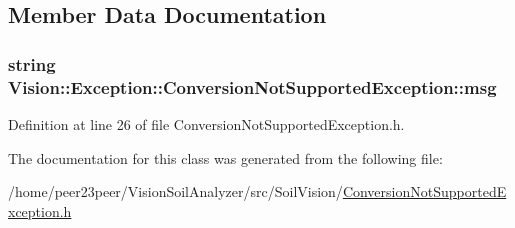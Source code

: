 \subsection{Member Data Documentation}
\hypertarget{class_vision_1_1_exception_1_1_conversion_not_supported_exception_a1cd5dd7edfb67cf5055374402b846daa}{}
\subsubsection[{msg}]{\setlength{\rightskip}{0pt plus 5cm}string Vision\+::\+Exception\+::\+Conversion\+Not\+Supported\+Exception\+::msg\hspace{0.3cm}{\ttfamily [private]}}\label{class_vision_1_1_exception_1_1_conversion_not_supported_exception_a1cd5dd7edfb67cf5055374402b846daa}


Definition at line 26 of file Conversion\+Not\+Supported\+Exception.\+h.



The documentation for this class was generated from the following file\+:\begin{DoxyCompactItemize}
\item 
/home/peer23peer/\+Vision\+Soil\+Analyzer/src/\+Soil\+Vision/\hyperlink{_conversion_not_supported_exception_8h}{Conversion\+Not\+Supported\+Exception.\+h}\end{DoxyCompactItemize}
